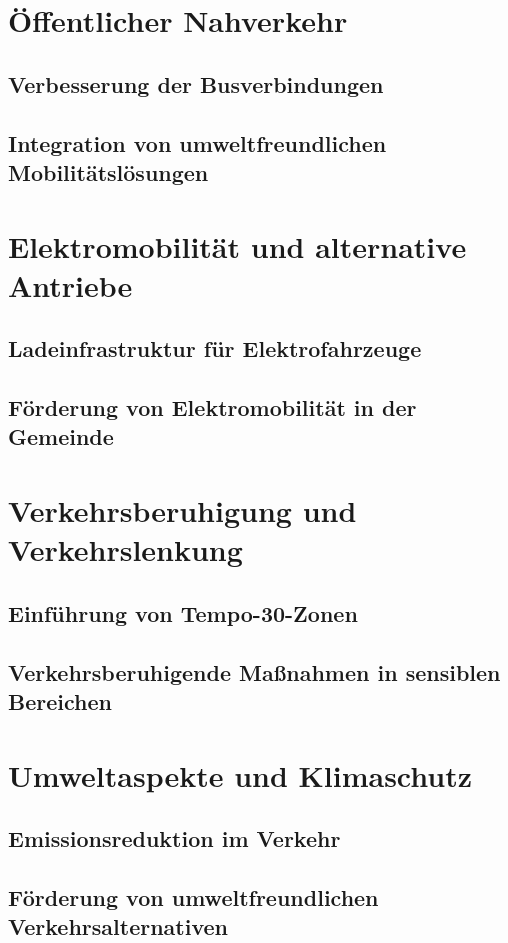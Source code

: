 \section{Öffentlicher Nahverkehr}
\subsection{Verbesserung der Busverbindungen}
\subsection{Integration von umweltfreundlichen Mobilitätslösungen}

\section{Elektromobilität und alternative Antriebe}
\subsection{Ladeinfrastruktur für Elektrofahrzeuge}
\subsection{Förderung von Elektromobilität in der Gemeinde}

\section{Verkehrsberuhigung und Verkehrslenkung}
\subsection{Einführung von Tempo-30-Zonen}
\subsection{Verkehrsberuhigende Maßnahmen in sensiblen Bereichen}

\section{Umweltaspekte und Klimaschutz}
\subsection{Emissionsreduktion im Verkehr}
\subsection{Förderung von umweltfreundlichen Verkehrsalternativen}
